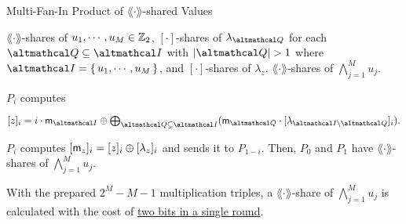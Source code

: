 \documentclass[../240906_cryptlab_flute.tex]{subfiles}
\begin{document}
\begin{frame}{Multi-Fan-In Product of \(\lang\cdot\rang\)-shared Values}
    \begin{block}{}
        \begin{description}[Output]
            \ii[Input]
            \(\lang\cdot\rang\)-shares of \(u_1, \cdots, u_M \in \mathbb{Z}_2\), \([\cdot]\)-shares of
            \(\lambda_{\mcal{Q}}\) for each \(\mcal{Q} \subseteq \mcal{I}\)
            with \(|\mcal{Q}| > 1\) where \(\mcal{I} = \{\,u_1, \cdots, u_M\,\}\),
            and \([\cdot]\)-shares of \(\lambda_z\).
            \ii[Output]
            \(\lang\cdot\rang\)-shares of \(\bigwedge_{j=1}^M u_j\).
        \end{description}
        \pause
        \begin{enumerate}
            \ii
            \(P_i\) computes
            \centerline{\(
                [z]_i = i \cdot \msf{m}_{\mcal{I}}
                \oplus \bigoplus_{\mcal{Q} \subsetneq \mcal{I}} (\msf{m}_{\mcal{Q}}
                \cdot [\lambda_{\mcal{I} \setminus \mcal{Q}}]_i).
            \)}
            \pause
            \ii
            \(P_i\) computes \([\mathsf{m}_z]_i = [z]_i \oplus [\lambda_z]_i\)
            and sends it to \(P_{1-i}\).
            \ii
            Then, \(P_0\) and \(P_1\) have \(\lang\cdot\rang\)-shares of \(\bigwedge_{j=1}^M u_j\).
        \end{enumerate}
        \pause
        With the prepared \(2^M - M - 1\) multiplication triples,
        a \(\lang\cdot\rang\)-share of \(\bigwedge_{j=1}^M u_j\)
        is calculated with the cost of \ul{two bits in a single round}.
    \end{block}
\end{frame}
\end{document}
